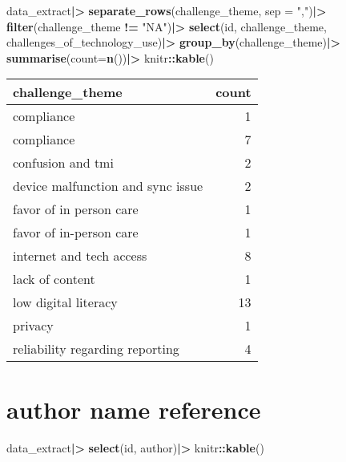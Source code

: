 \documentclass[
]{article}
\newenvironment{Shaded}{\begin{snugshade}}{\end{snugshade}}
\newcommand{\AttributeTok}[1]{\textcolor[rgb]{0.13,0.29,0.53}{#1}}
\newcommand{\FunctionTok}[1]{\textcolor[rgb]{0.13,0.29,0.53}{\textbf{#1}}}
\newcommand{\NormalTok}[1]{#1}
\newcommand{\SpecialCharTok}[1]{\textcolor[rgb]{0.81,0.36,0.00}{\textbf{#1}}}
\newcommand{\StringTok}[1]{\textcolor[rgb]{0.31,0.60,0.02}{#1}}
\begin{document}
\begin{Shaded}
\begin{Highlighting}[]
\NormalTok{data\_extract}\SpecialCharTok{|\textgreater{}}
  \FunctionTok{separate\_rows}\NormalTok{(challenge\_theme, }\AttributeTok{sep =} \StringTok{","}\NormalTok{)}\SpecialCharTok{|\textgreater{}}
  \FunctionTok{filter}\NormalTok{(challenge\_theme }\SpecialCharTok{!=} \StringTok{"NA"}\NormalTok{)}\SpecialCharTok{|\textgreater{}}
  \FunctionTok{select}\NormalTok{(id, challenge\_theme, challenges\_of\_technology\_use)}\SpecialCharTok{|\textgreater{}}
  \FunctionTok{group\_by}\NormalTok{(challenge\_theme)}\SpecialCharTok{|\textgreater{}}
  \FunctionTok{summarise}\NormalTok{(}\AttributeTok{count=}\FunctionTok{n}\NormalTok{())}\SpecialCharTok{|\textgreater{}}
\NormalTok{  knitr}\SpecialCharTok{::}\FunctionTok{kable}\NormalTok{()}
\end{Highlighting}
\end{Shaded}

\begin{longtable}[]{@{}lr@{}}
\toprule\noalign{}
challenge\_theme & count \\
\midrule\noalign{}
\endhead
\bottomrule\noalign{}
\endlastfoot
compliance & 1 \\
compliance & 7 \\
confusion and tmi & 2 \\
device malfunction and sync issue & 2 \\
favor of in person care & 1 \\
favor of in-person care & 1 \\
internet and tech access & 8 \\
lack of content & 1 \\
low digital literacy & 13 \\
privacy & 1 \\
reliability regarding reporting & 4 \\
\end{longtable}

\section{author name reference}\label{author-name-reference}

\begin{Shaded}
\begin{Highlighting}[]
\NormalTok{data\_extract}\SpecialCharTok{|\textgreater{}}
  \FunctionTok{select}\NormalTok{(id, author)}\SpecialCharTok{|\textgreater{}}
\NormalTok{  knitr}\SpecialCharTok{::}\FunctionTok{kable}\NormalTok{()}
\end{Highlighting}
\end{Shaded}
\end{document}
